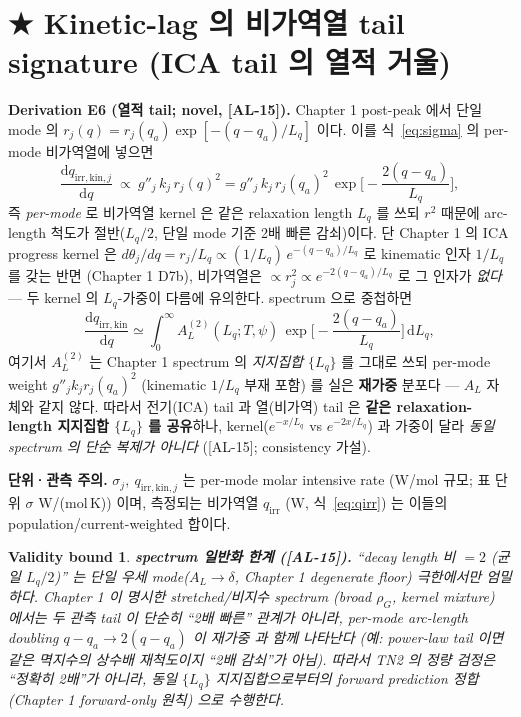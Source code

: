 \documentclass[11pt,a4paper]{article}
\newtheorem*{boundbox}{Validity bound}
\newcommand{\dd}{\mathrm{d}}
\newcommand{\irr}{\mathrm{irr}}
\newcommand{\kin}{\mathrm{kin}}
\newcommand{\AL}[1]{\textsf{[AL-#1]}}
\begin{document}
\section{★ Kinetic-lag 의 비가역열 tail signature (ICA tail 의 열적 거울)}\label{sec:thermal_tail}
\textbf{Derivation E6 (열적 tail; novel, \AL{15}).} Chapter 1 post-peak 에서 단일 mode 의
$r_j(q)=r_j(q_a)\exp[-(q-q_a)/L_q]$ 이다. 이를 식~\eqref{eq:sigma} 의 per-mode 비가역열에 넣으면
\begin{equation}
\frac{\dd q_{\irr,\kin,j}}{\dd q}\ \propto\ g''_j\,k_j\,r_j(q)^2
= g''_j\,k_j\,r_j(q_a)^2\,\exp\!\Big[-\frac{2(q-q_a)}{L_q}\Big],
\label{eq:thermal_single}
\end{equation}
즉 \emph{per-mode} 로 비가역열 kernel 은 같은 relaxation length $L_q$ 를 쓰되 $r^2$ 때문에 arc-length
척도가 절반($L_q/2$, 단일 mode 기준 2배 빠른 감쇠)이다. 단 Chapter 1 의 ICA progress kernel 은
$d\theta_j/dq=r_j/L_q\propto (1/L_q)\,e^{-(q-q_a)/L_q}$ 로 kinematic 인자 $1/L_q$ 를 갖는 반면
(Chapter 1 D7b), 비가역열은 $\propto r_j^2\propto e^{-2(q-q_a)/L_q}$ 로 그 인자가 \emph{없다}
— 두 kernel 의 $L_q$-가중이 다름에 유의한다. spectrum 으로 중첩하면
\begin{equation}
\boxed{\;\frac{\dd q_{\irr,\kin}}{\dd q}\simeq\int_0^\infty A_L^{(2)}(L_q;T,\psi)\,
\exp\!\Big[-\frac{2(q-q_a)}{L_q}\Big]\,\dd L_q,\;}
\label{eq:thermal_kernel}
\end{equation}
여기서 $A_L^{(2)}$ 는 Chapter 1 spectrum 의 \emph{지지집합} $\{L_q\}$ 를 그대로 쓰되 per-mode weight
$g''_j k_j r_j(q_a)^2$ (kinematic $1/L_q$ 부재 포함) 를 실은 \textbf{재가중} 분포다 — $A_L$ 자체와
같지 않다. 따라서 전기(ICA) tail 과 열(비가역) tail 은 \textbf{같은 relaxation-length 지지집합
$\{L_q\}$ 를 공유}하나, kernel($e^{-x/L_q}$ vs $e^{-2x/L_q}$) 과 가중이 달라 \emph{동일 spectrum 의
단순 복제가 아니다} (\AL{15}; consistency 가설).

\textbf{단위·관측 주의.} $\sigma_j,\ q_{\irr,\kin,j}$ 는 per-mode molar intensive rate (W/mol
규모; 표 단위 $\sigma$ W/(mol\,K)) 이며, 측정되는 비가역열 $q_\irr$ (W, 식~\eqref{eq:qirr}) 는
이들의 population/current-weighted 합이다.
\begin{boundbox}
\textbf{spectrum 일반화 한계 (\AL{15}).} ``decay length 비 $=2$ (균일 $L_q/2$)'' 는 \emph{단일 우세
mode}($A_L\!\to\!\delta$, Chapter 1 degenerate floor) 극한에서만 엄밀하다. Chapter 1 이 명시한
\emph{stretched/비지수} spectrum (broad $\rho_G$, kernel mixture) 에서는 두 관측 tail 이 단순히
``2배 빠른'' 관계가 아니라, per-mode arc-length doubling $q-q_a\!\to\!2(q-q_a)$ 이 \emph{재가중} 과
함께 나타난다 (예: power-law tail 이면 같은 멱지수의 상수배 재척도이지 ``2배 감쇠''가 아님). 따라서
TN2 의 정량 검정은 ``정확히 2배''가 아니라, \emph{동일 $\{L_q\}$ 지지집합으로부터의 forward
prediction 정합}(Chapter 1 forward-only 원칙) 으로 수행한다.
\end{boundbox}
\end{document}
